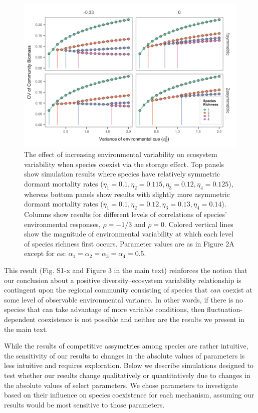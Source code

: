 \documentclass[11pt,]{article}
\begin{document}
\begin{figure}[!ht]
  \centering
      \includegraphics[width=6in]{./components/SI_storage_effect_asymmetric_etas.png}
  \caption{The effect of increasing environmental variability on ecosystem variability when species coexist via the storage effect. Top panels show simulation results where species have relatively symmetric dormant mortality rates ($\eta_1=0.1, \eta_2=0.115, \eta_3=0.12, \eta_4=0.125$), whereas bottom panels show results with slightly more asymmetric dormant mortality rates ($\eta_1=0.1, \eta_2=0.12, \eta_3=0.13, \eta_4=0.14$). Columns show results for different levels of correlations of species' environmental responses, $\rho = -1/3$ and $\rho = 0$. Colored vertical lines show the magnitude of environmental variability at which each level of species richness first occurs. Parameter values are as in Figure 2A except for $\alpha$s: $\alpha_1 = \alpha_2 = \alpha_3 = \alpha_4 = 0.5$.}
\end{figure}

This result (Fig. S1-x and Figure 3 in the main text) reinforces the
notion that our conclusion about a positive diversity--ecosystem
variability relationship is contingent upon the regional community
consisting of species that \emph{can} coexist at some level of
observable environmental variance. In other words, if there is no
species that can take advantage of more variable conditions, then
fluctuation-dependent coexistence is not possible and neither are the
results we present in the main text.

While the results of competitive assymetries among species are rather
intuitive, the sensitivity of our results to changes in the absolute
values of parameters is less intuitive and requires exploration. Below
we describe simulations designed to test whether our results change
qualitatively or quantitatively due to changes in the absolute values of
select parameters. We chose parameters to investigate based on their
influence on species coexistence for each mechanism, assuming our
results would be most sensitive to those parameters.
\end{document}
